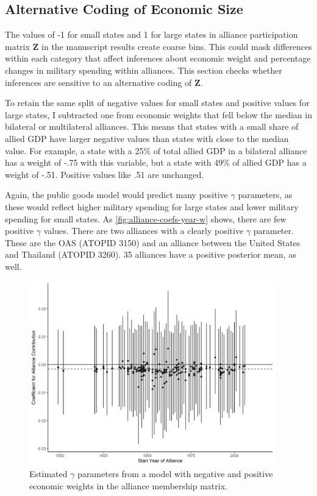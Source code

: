 \documentclass[12pt]{article}
\begin{document}
\subsection{Alternative Coding of Economic Size}


The values of -1 for small states and 1 for large states in alliance participation matrix $\textbf{Z}$ in the manuscript results create coarse bins. 
This could mask differences within each category that affect inferences about economic weight and percentage changes in military spending within alliances. 
This section checks whether inferences are sensitive to an alternative coding of $\textbf{Z}$. 


To retain the same split of negative values for small states and positive values for large states, I subtracted one from economic weights that fell below the median in bilateral or multilateral alliances. 
This means that states with a small share of allied GDP have larger negative values than states with close to the median value. 
For example, a state with a 25\% of total allied GDP  in a bilateral alliance has a weight of -.75 with this variable, but a state with 49\% of allied GDP has a weight of -.51. 
Positive values like .51 are unchanged.


Again, the public goods model would predict many positive $\gamma$ parameters, as these would reflect higher military spending for large states and lower military spending for small states. 
As \autoref{fig:alliance-coefs-year-w} shows, there are few positive $\gamma$ values.  
There are two alliances with a clearly positive $\gamma$ parameter. 
These are the OAS (ATOPID 3150) and an alliance between the United States and Thailand (ATOPID 3260). 
35 alliances have a positive posterior mean, as well. 

\begin{figure}[htbp]
	\centering
		\includegraphics[width=0.95\textwidth]{alliance-coefs-year-w.png}
	\caption{Estimated $\gamma$ parameters from a model with negative and positive economic weights in the alliance membership matrix.}
	\label{fig:alliance-coefs-year-w}
\end{figure}
\end{document}
